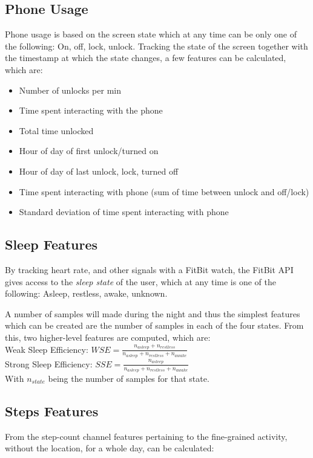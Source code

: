 \subsection{Phone Usage}
Phone usage is based on the screen state which at any time can be only one of the following: On, off, lock, unlock. Tracking the state of the screen together with the timestamp at which the state changes, a few features can be calculated, which are:

\begin{itemize}
    \item Number of unlocks per min
    \item Time spent interacting with the phone
    \item Total time unlocked
    \item Hour of day of first unlock/turned on
    \item Hour of day of last unlock, lock, turned off
    \item Time spent interacting with phone (sum of time between unlock and off/lock)
    \item Standard deviation of time spent interacting with phone
\end{itemize}


\subsection{Sleep Features}
By tracking heart rate, and other signals with a FitBit watch, the FitBit API gives access to the \textit{sleep state} of the user, which at any time is one of the following: Asleep, restless, awake, unknown.

A number of samples will made during the night and thus the simplest features which can be created are the number of samples in each of the four states. 
From this, two higher-level features are computed, which are: \\

Weak Sleep Efficiency: $WSE = \frac{n_{asleep} + n_{restless}}{n_{asleep} + n_{restless} + n_{awake}}$\\

Strong Sleep Efficiency: $SSE = \frac{n_{asleep}}{n_{asleep} + n_{restless} + n_{awake}}$\\

With $n_{state}$ being the number of samples for that state.


\subsection{Steps Features}
From the step-count channel features pertaining to the fine-grained activity, without the location, for a whole day, can be calculated:

